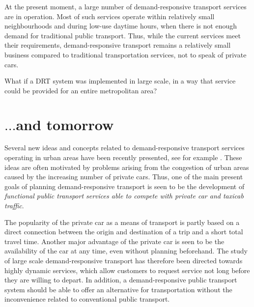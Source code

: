 \documentclass[dissertation,draft*]{aaltoseries}
\begin{document}
At the present moment, a large number of demand-responsive transport services are 
in operation. Most of such services operate within relatively small neighbourhoods and 
during low-use daytime hours, when there is not enough demand for traditional 
public transport. Thus, while the current services meet their requirements,
demand-responsive transport remains a relatively small business
compared to traditional transportation services, not to speak of private cars.

What if a DRT system was implemented in large scale, in a way that service could be provided
for an entire metropolitan area?

\section{$\ldots$and tomorrow}
Several new ideas and concepts related to demand-responsive transport
services operating in urban areas have been recently presented, see for example \cite{cortes,jokinen-fists-2011}.
These ideas are often motivated by problems arising from the congestion of urban 
areas caused by the increasing number of private cars.
Thus, one of the main present goals of planning demand-responsive transport is seen
to be the development of \emph{functional public transport services able to compete
with private car and taxicab traffic}.


The popularity of the private car as a means of transport is partly based on
a direct connection between the origin and destination of a trip and
a short total travel time. 
Another major advantage of the private car is seen to be the availability
of the car at any time, even without planning beforehand. The study of large scale 
demand-responsive transport has therefore been directed towards highly dynamic services, which allow 
customers to request service not long before they are willing to depart.
In addition, a demand-responsive public transport system should be
able to offer an alternative for transportation without
the inconvenience related to conventional public transport.

\end{document}
